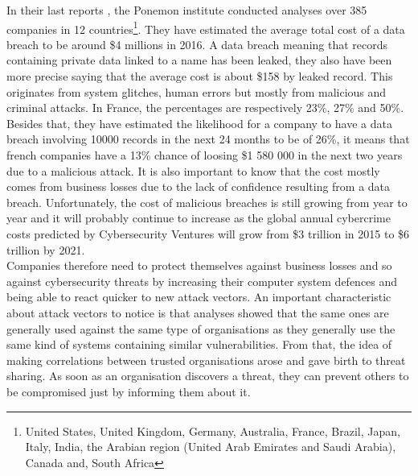\documentclass{eplmastersthesis}
\begin{document}
In their last reports \cite{ponemon2016cost, ponemon2016costFr}, the Ponemon institute conducted analyses over 385 companies in 12 countries\footnote{United States, United Kingdom, Germany, Australia, France, Brazil, Japan, Italy, India, the Arabian region (United Arab Emirates and Saudi Arabia), Canada and, South Africa}. They have estimated the average total cost of a data breach to be around \$4 millions in 2016. A data breach meaning that records containing private data linked to a name has been leaked, they also have been more precise saying that the average cost is about \$158 by leaked record. This originates from system glitches, human errors but mostly from malicious and criminal attacks. In France, the percentages are respectively 23\%, 27\% and 50\%. Besides that, they have estimated the likelihood for a company to have a data breach involving 10000 records in the next 24 months to be of 26\%, it means that french companies have a 13\% chance of loosing \$1 580 000 in the next two years due to a malicious attack. It is also important to know that the cost mostly comes from business  losses due to the lack of confidence resulting from a data breach. Unfortunately, the cost of malicious breaches is still growing from year to year and it will probably continue to increase as the global annual cybercrime costs predicted by Cybersecurity Ventures will grow from  \$3 trillion in 2015 to \$6 trillion by 2021.\\

Companies therefore need to protect themselves against business losses and so against cybersecurity threats by increasing their computer system defences and being able to react quicker to new attack vectors. An important characteristic about attack vectors to notice is that analyses showed that the same ones are generally used against the same type of organisations as they generally use the same kind of systems containing similar vulnerabilities. From that, the idea of making correlations between trusted organisations arose and gave birth to threat sharing.  As soon as an organisation discovers a threat, they can prevent others to be compromised just by informing them about it.\\
\end{document}
